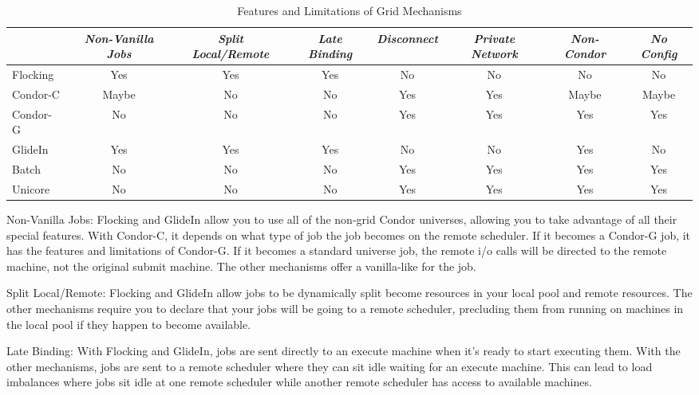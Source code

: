 \begin{center}
\begin{table}[hbt]
\begin{tabular}{|l||c|c|c|c|c|c|c|} \hline
 & \emph{Non-Vanilla Jobs} & \emph{Split Local/Remote} &
\emph{Late Binding} & \emph{Disconnect} & \emph{Private Network} &
\emph{Non-Condor} & \emph{No Config} \\ \hline \hline
Flocking & Yes & Yes & Yes & No & No & No & No \\ \hline
Condor-C & Maybe & No & No & Yes & Yes & Maybe & Maybe \\ \hline
Condor-G & No & No & No & Yes & Yes & Yes & Yes \\ \hline
GlideIn & Yes & Yes & Yes & No & No & Yes & No \\ \hline
Batch & No & No & No & Yes & Yes & Yes & Yes \\ \hline
Unicore & No & No & No & Yes & Yes & Yes & Yes \\ \hline
\end{tabular}
\caption{\label{grid-features}Features and Limitations of Grid Mechanisms}
\end{table}
\end{center}

Non-Vanilla Jobs: Flocking and GlideIn allow you to use all of the
non-grid Condor universes, allowing you to take advantage of all their
special features. With Condor-C, it depends on what type of job the job
becomes on the remote scheduler. If it becomes a Condor-G job, it has the
features and limitations of Condor-G. If it becomes a standard universe
job, the remote i/o calls will be directed to the remote machine, not the
original submit machine. The other mechanisms offer a vanilla-like for the
job.

Split Local/Remote: Flocking and GlideIn allow jobs to be dynamically
split become resources in your local pool and remote resources. The
other mechanisms require you to declare that your jobs will be going to
a remote scheduler, precluding them from running on machines in the local
pool if they happen to become available.

Late Binding: With Flocking and GlideIn, jobs are sent directly to an
execute machine when it's ready to start executing them. With the other
mechanisms, jobs are sent to a remote scheduler where they can sit idle
waiting for an execute machine. This can lead to load imbalances where
jobs sit idle at one remote scheduler while another remote scheduler has
access to available machines.

